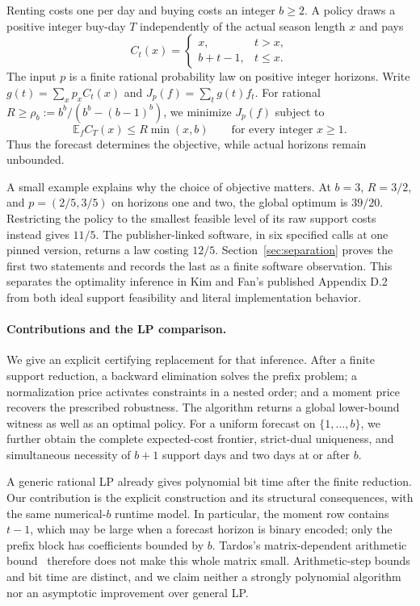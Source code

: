 \documentclass[manuscript,11pt,screen,nonacm]{acmart}
\newcommand{\E}{\mathbb E}
\begin{document}
Renting costs one per day and buying costs an integer $b\ge2$.
A policy draws a positive integer buy-day $T$ independently of the actual
season length $x$ and pays
\[
 C_t(x)=\begin{cases}x,&t>x,\\ b+t-1,&t\le x.\end{cases}
\]
The input $p$ is a finite rational probability law on positive integer
horizons. Write $g(t)=\sum_xp_x C_t(x)$ and $J_p(f)=\sum_tg(t)f_t$.
For rational $R\ge\rho_b:=b^b/(b^b-(b-1)^b)$, we minimize $J_p(f)$ subject to
\begin{equation}\label{eq:robust}
 \E_f C_T(x)\le R\min(x,b)\qquad\text{for every integer }x\ge1.
\end{equation}
Thus the forecast determines the objective, while actual horizons remain
unbounded.

A small example explains why the choice of objective matters. At $b=3$,
$R=3/2$, and $p=(2/5,3/5)$ on horizons one and two, the global optimum is
$39/20$. Restricting the policy to the smallest feasible level of its raw
support costs instead gives $11/5$. The publisher-linked software, in six
specified calls at one pinned version, returns a law costing $12/5$.
Section~\ref{sec:separation} proves the first two statements and records the
last as a finite software observation. This separates the optimality
inference in Kim and Fan's published Appendix D.2~\cite{pmlr-v306-kim26l}
from both ideal support feasibility and literal implementation behavior.

\paragraph{Contributions and the LP comparison.}
We give an explicit certifying replacement for that inference. After a
finite support reduction, a backward elimination solves the prefix problem;
a normalization price activates constraints in a nested order; and a moment
price recovers the prescribed robustness. The algorithm returns a global
lower-bound witness as well as an optimal policy. For a uniform forecast on
$\{1,\ldots,b\}$, we further obtain the complete expected-cost frontier,
strict-dual uniqueness, and simultaneous necessity of $b+1$ support days and
two days at or after $b$.

A generic rational LP already gives polynomial bit time after the finite
reduction. Our contribution is the explicit construction and its structural
consequences, with the same numerical-$b$ runtime model. In particular, the
moment row contains $t-1$, which may be large when a forecast horizon is
binary encoded; only the prefix block has coefficients bounded by $b$.
Tardos's matrix-dependent arithmetic bound~\cite{Tardos_1986} therefore
does not make this whole matrix small. Arithmetic-step bounds and bit time
are distinct, and we claim neither a strongly polynomial algorithm nor an
asymptotic improvement over general LP.
\end{document}
